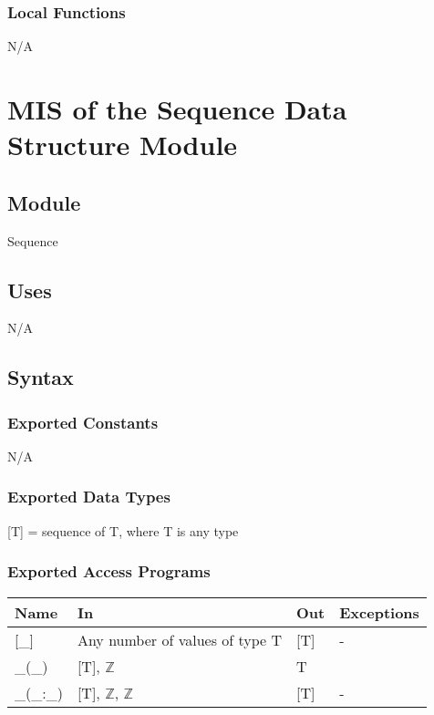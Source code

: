 \documentclass[12pt, titlepage]{article}
\begin{document}
\subsubsection{Local Functions}
N/A


\section{MIS of the Sequence Data Structure Module} \label{sec:SequenceData}

\subsection{Module}
Sequence

\subsection{Uses}

N/A

\subsection{Syntax}

\subsubsection{Exported Constants}
N/A

\subsubsection{Exported Data Types}

[T] = sequence of T, where T is any type

\subsubsection{Exported Access Programs}

\begin{center}
	\renewcommand*{\arraystretch}{1.5}
	\begin{tabular} {p{}  p{}  p{} 
			p{} } \hline 
		\textbf{Name} & \textbf{In} & \textbf{Out} & \textbf{Exceptions} \\ 
		\hline
		
		[\_] & Any number of values of type T & [T] & - \\ 
		\_(\_) & [T], $\mathbb{Z}$ & T & \\
		\_(\_:\_) & [T], $\mathbb{Z}$, $\mathbb{Z}$ & [T] & - \\\hline
	\end{tabular}
\end{center}
\end{document}
